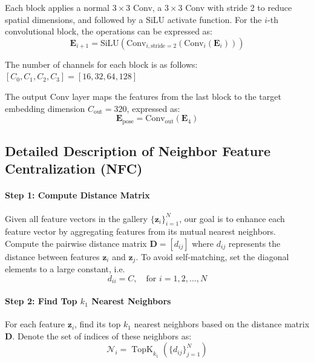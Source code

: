 Each block applies a normal \(3 \times 3\) Conv, a \(3 \times 3\) Conv with stride 2 to reduce spatial dimensions, and followed by a SiLU activate function.
For the \(i\)-th convolutional block, the operations can be expressed as:
\begin{equation}
\mathbf{E}_{i+1} = \text{SiLU}(\text{Conv}_{i, \text{stride}=2}(\text{Conv}_{i}(\mathbf{E}_i)))
\end{equation}

The number of channels for each block is as follows: $[C_0, C_1, C_2, C_3] = [16, 32, 64, 128]$

The output Conv layer maps the features from the last block to the target embedding dimension \(C_{\text{out}} = 320\), 
expressed as:
\begin{equation}
\mathbf{E}_{\text{pose}} = \text{Conv}_{\text{out}}(\mathbf{E}_4)
\end{equation}


\subsection{Detailed Description of Neighbor Feature Centralization (NFC)}

\paragraph{Step 1: Compute Distance Matrix}

Given all feature vectors in the gallery \(\{\mathbf{z}_i\}_{i=1}^N\), our goal is to enhance each feature vector by aggregating features from its mutual nearest neighbors.
Compute the pairwise distance matrix \(\mathbf{D} = [d_{ij}]\) where \(d_{ij}\) represents the distance between features \(\mathbf{z}_i\) and \(\mathbf{z}_j\). To avoid self-matching, set the diagonal elements to a large constant, i.e. \[d_{ii} = C, \quad \text{for } i = 1, 2, \dots, N\]

\paragraph{Step 2: Find Top \(k_1\) Nearest Neighbors}

For each feature \(\mathbf{z}_i\), find its top \(k_1\) nearest neighbors based on the distance matrix \(\mathbf{D}\). Denote the set of indices of these neighbors as:
\begin{equation}
\mathcal{N}_{i} = \operatorname{TopK}_{k_1}(\{d_{ij}\}_{j=1}^N)
\end{equation}

